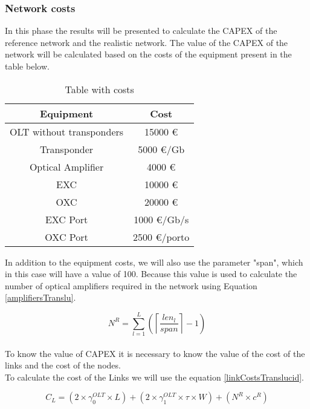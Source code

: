 \subsubsection{Network costs}

In this phase the results will be presented to calculate the CAPEX of the reference network and the realistic network.
The value of the CAPEX of the network will be calculated based on the costs of the equipment present in the table below.\\

\begin{table}[h!]
\centering
\begin{tabular}{|| c | c||}
 \hline
 Equipment & Cost \\
 \hline\hline
 OLT without transponders & 15000 \euro \\
 Transponder & 5000 \euro/Gb \\
 Optical Amplifier & 4000 \euro \\
 EXC & 10000 \euro \\
 OXC & 20000 \euro \\
 EXC Port & 1000 \euro /Gb/s\\
 OXC Port & 2500 \euro /porto \\
 \hline
\end{tabular}
\caption{Table with costs}
\label{table_cost3}
\end{table}

In addition to the equipment costs, we will also use the parameter "span", which in this case will have a value of 100.
Because this value is used to calculate the number of optical amplifiers required in the network using Equation \ref{amplifiersTranslu}.

\begin{equation}
N^R = \sum\limits_{l=1}^L\left(\left\lceil\frac{len_l}{span}\right\rceil-1\right)
\label{amplifiersTranslu}
\end{equation} \\


To know the value of CAPEX it is necessary to know the value of the cost of the links and the cost of the nodes.\\
To calculate the cost of the Links we will use the equation \ref{linkCostsTranslucid}.

\begin{equation}
C_L = \left(2 \times \gamma_0^{OLT} \times L\right) + \left(2 \times \gamma_1^{OLT} \times \tau \times W\right) + \left(N^R \times c^R\right)
\label{linkCostsTranslucid}
\end{equation}

